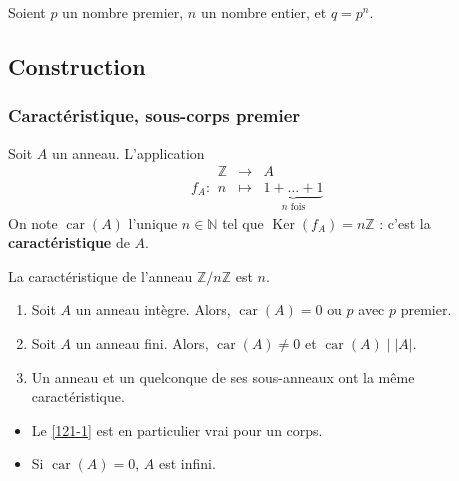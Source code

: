 




	Soient $p$ un nombre premier, $n$ un nombre entier, et $q = p^n$.
	
	\subsection{Construction}
	
	\subsubsection{Caractéristique, sous-corps premier}
	
	
	\begin{definition}
		Soit $A$ un anneau. L'application
		\[
		f_A :
		\begin{array}{ccc}
			\mathbb{Z} &\rightarrow& A \\
			n &\mapsto& \underbrace{1 + \dots + 1}_{n \text{ fois}}
		\end{array}
		\]
		On note $\operatorname{car}(A)$ l'unique $n \in \mathbb{N}$ tel que $\operatorname{Ker}(f_A) = n\mathbb{Z}$ : c'est la \textbf{caractéristique} de $A$.
	\end{definition}
	
	\begin{example}
		La caractéristique de l'anneau $\mathbb{Z}/n\mathbb{Z}$ est $n$.
	\end{example}
	
	\begin{proposition}
		\begin{enumerate}[label=(\roman*)]
			\item \label{121-1} Soit $A$ un anneau intègre. Alors, $\operatorname{car}(A) = 0 \text{ ou } p$ avec $p$ premier.
			\item Soit $A$ un anneau fini. Alors, $\operatorname{car}(A) \neq 0$ et $\operatorname{car}(A) \mid |A|$.
			\item Un anneau et un quelconque de ses sous-anneaux ont la même caractéristique.
		\end{enumerate}
	\end{proposition}
	
	\begin{remark}
		\begin{itemize}
			\item Le \cref{121-1} est en particulier vrai pour un corps.
			\item Si $\operatorname{car}(A) = 0$, $A$ est infini.
		\end{itemize}
	\end{remark}
	
